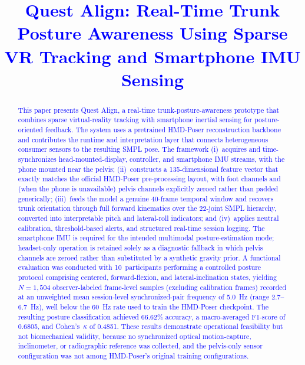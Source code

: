 \documentclass[conference]{IEEEtran}
\newcommand{\CC}[1]{\textcolor{blue}{#1}}
\begin{document}
\title{\CC{Quest Align: Real-Time Trunk Posture Awareness Using Sparse VR Tracking and Smartphone IMU Sensing}}

\author{
\and
{}
}

\maketitle

\begin{abstract}
\CC{This paper presents Quest Align, a real-time trunk-posture-awareness prototype that
combines sparse virtual-reality tracking with smartphone inertial sensing for
posture-oriented feedback. The system uses a pretrained HMD-Poser reconstruction backbone
and contributes the runtime and interpretation layer that connects heterogeneous consumer
sensors to the resulting SMPL pose. The framework (i)~acquires and time-synchronizes head-mounted-display,
controller, and smartphone IMU streams, with the phone mounted near the pelvis; (ii)~constructs
a 135-dimensional feature vector that exactly matches the official HMD-Poser pre-processing
layout, with foot channels and (when the phone is unavailable) pelvis channels explicitly
zeroed rather than padded generically; (iii)~feeds the model a genuine 40-frame temporal
window and recovers trunk orientation through full forward kinematics over the 22-joint
SMPL hierarchy, converted into interpretable pitch and lateral-roll indicators; and
(iv)~applies neutral calibration, threshold-based alerts, and structured real-time session
logging. The smartphone IMU is required for the intended multimodal posture-estimation mode;
headset-only operation is retained solely as a diagnostic fallback in which pelvis channels
are zeroed rather than substituted by a synthetic gravity prior. A functional evaluation was
conducted with 10~participants performing a controlled posture protocol comprising centered,
forward-flexion, and lateral-inclination states, yielding $N=1{,}504$ observer-labeled
frame-level samples (excluding calibration frames) recorded at an unweighted mean
session-level synchronized-pair frequency of 5.0~Hz (range 2.7--6.7~Hz), well below the
60~Hz rate used to train the HMD-Poser checkpoint. The resulting posture classification
achieved 66.62\% accuracy, a macro-averaged F1-score of 0.6805, and Cohen's~$\kappa$ of
0.4851. These results demonstrate operational feasibility but not biomechanical validity,
because no synchronized optical motion-capture, inclinometer, or radiographic reference was
collected, and the pelvis-only sensor configuration was not among HMD-Poser's original
training configurations.}
\end{abstract}
\end{document}
